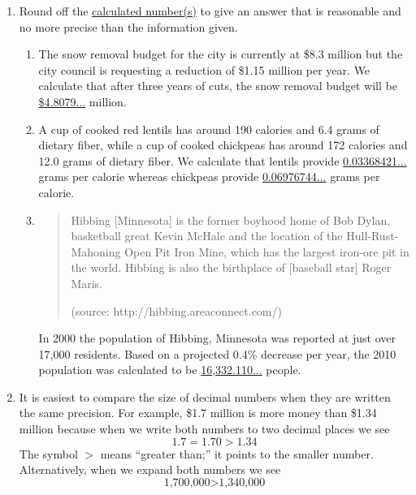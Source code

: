 \begin{enumerate}
\newpage

\item Round off the \underline{calculated number(s)} to give an answer that is reasonable and no more precise than the information given.

\begin{enumerate}
\item The snow removal budget for the city is currently at \$8.3 million but the city council is requesting a reduction of \$1.15 million per year.  We calculate that after three years of cuts, the snow removal budget will be \underline{\$4.8079...} million. 
\vfill
\item A cup of cooked red lentils has around 190 calories and 6.4 grams of dietary fiber, while a cup of cooked chickpeas has around 172 calories and 12.0 grams of dietary fiber.  We calculate that lentils provide \underline{0.03368421...} grams per calorie whereas chickpeas provide \underline{0.06976744...} grams per calorie. 
\vfill
\item \begin{quote} Hibbing [Minnesota] is the former boyhood home of Bob Dylan, basketball great Kevin McHale and the location of the Hull-Rust-Mahoning Open Pit Iron Mine, which has the largest iron-ore pit in the world. Hibbing is also the birthplace of [baseball star] Roger Maris.

\hfill \begin{tiny} (source: http://hibbing.areaconnect.com/)\end{tiny}\end{quote}  

In 2000 the population of Hibbing, Minnesota was reported at just over 17,000 residents. Based on a projected 0.4\% decrease per year, the 2010 population was calculated to be \underline{16,332.110...} people. 
\vfill
\end{enumerate}

\newpage

\item It is easiest to compare the size of decimal numbers when they are written the same precision.  For example, \$1.7 million is more money than \$1.34 million because when we write both numbers to two decimal places we see $$1.7 = 1.70 > 1.34$$  The symbol $>$ means ``greater than;'' it points to the smaller number.  Alternatively, when we expand both numbers we see $$\text{1,700,000}  > \text{1,340,000}$$  


\end{enumerate}
